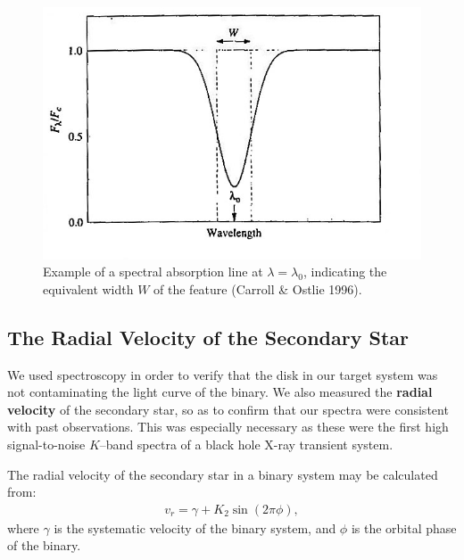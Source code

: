 \begin{figure}[!htb]
\begin{center}
\includegraphics[width=5.0in]{CarrollEquiv}
\caption{%
Example of a spectral absorption line at $\lambda=\lambda_0$,
indicating the equivalent width $W$ of the
feature (Carroll \& Ostlie 1996). }\label{cha:InfraredDataReductionTechniques:sec:Spectroscopy:subsec:EquivalentWidth:fig:CarrollEquiv}
\end{center}
\end{figure}

\nocite{CarrollOstlie:1996}


\subsection{The Radial Velocity of the Secondary Star}\label{cha:InfraredDataReductionTechniques:sec:Spectroscopy:subsec:RadialVelocity}

We used spectroscopy in order to verify that the disk in our target system was not contaminating the light curve of the binary. We also measured the \textbf{radial velocity} of the secondary star, so as to confirm that our spectra were consistent with past observations. This was especially necessary as these were the first high signal-to-noise $K$--band spectra of a black hole X-ray
transient system.

\vspace{\myparskip}

The radial velocity of the secondary star in a
binary system may be calculated from:
\begin{eqnarray}\label{cha:InfraredDataReductionTechniques:sec:Spectroscopy:subsec:RadialVelocity:eqn:Vr}
v_r = \gamma + K_2 \sin{(2\pi\phi)},
\end{eqnarray}
where $\gamma$ is the systematic velocity of the binary system, and
$\phi$ is the orbital phase of the binary.

